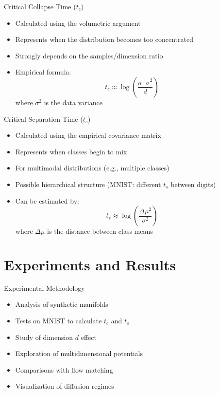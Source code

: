 \documentclass[aspectratio=169]{beamer}
\begin{document}
\begin{frame}{Critical Collapse Time ($t_c$)}
    \begin{itemize}
        \item Calculated using the volumetric argument
        \item Represents when the distribution becomes too concentrated
        \item Strongly depends on the samples/dimension ratio
        \item Empirical formula:
        \begin{equation}
            t_c \approx \log\left(\frac{n \cdot \sigma^2}{d}\right)
        \end{equation}
        where $\sigma^2$ is the data variance
    \end{itemize}
\end{frame}

\begin{frame}{Critical Separation Time ($t_s$)}
    \begin{itemize}
        \item Calculated using the empirical covariance matrix
        \item Represents when classes begin to mix
        \item For multimodal distributions (e.g., multiple classes)
        \item Possible hierarchical structure (MNIST: different $t_s$ between digits)
        \item Can be estimated by:
        \begin{equation}
            t_s \approx \log\left(\frac{\Delta\mu^2}{\sigma^2}\right)
        \end{equation}
        where $\Delta\mu$ is the distance between class means
    \end{itemize}
\end{frame}

\section{Experiments and Results}

\begin{frame}{Experimental Methodology}
    \begin{itemize}
        \item Analysis of synthetic manifolds
        \item Tests on MNIST to calculate $t_c$ and $t_s$
        \item Study of dimension $d$ effect
        \item Exploration of multidimensional potentials
        \item Comparisons with flow matching
        \item Visualization of diffusion regimes
    \end{itemize}
\end{frame}
\end{document}
